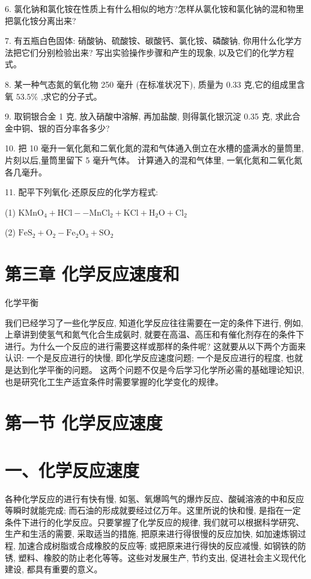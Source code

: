 \documentclass[10pt]{article}
\begin{document}
6. 氯化钠和氯化铵在性质上有什么相似的地方?怎样从氯化铵和氯化钠的混和物里把氯化铵分离出来?

7. 有五瓶白色固体: 硝酸钠、硫酸铵、碳酸钙、氯化铵、磷酸钠, 你用什么化学方法把它们分别检验出来? 写出实验操作步骤和产生的现象, 以及它们的化学方程式。

8. 某一种气态氮的氧化物 250 毫升 (在标准状况下), 质量为 0.33 克,它的组成里含氧 \({53.5}\%\) ,求它的分子式。

9. 取铜银合金 1 克, 放入硝酸中溶解, 再加盐酸, 则得氯化银沉淀 0.35 克, 求此合金中铜、银的百分率各多少?

10. 把 10 毫升一氧化氮和二氧化氮的混和气体通入倒立在水槽的盛满水的量筒里,片刻以后,量筒里留下 5 毫升气体。 计算通入的混和气体里, 一氧化氮和二氧化氮各几毫升。

11. 配平下列氧化-还原反应的化学方程式:

(1) \({\mathrm{{KMnO}}}_{4} + \mathrm{{HCl}} - - {\mathrm{{MnCl}}}_{2} + \mathrm{{KCl}} + {\mathrm{H}}_{2}\mathrm{O} + {\mathrm{{Cl}}}_{2}\)

(2) \({\mathrm{{FeS}}}_{2} + {\mathrm{O}}_{2} - {\mathrm{{Fe}}}_{2}{\mathrm{O}}_{3} + {\mathrm{{SO}}}_{2}\)

\section*{第三章 化学反应速度和}

化学平衡

我们已经学习了一些化学反应, 知道化学反应往往需要在一定的条件下进行, 例如, 上章讲到使氢气和氮气化合生成氨时, 就要在高温、高压和有催化剂存在的条件下进行。为什么一个反应的进行需要这样或那样的条件呢? 这就要从以下两个方面来认识: 一个是反应进行的快慢, 即化学反应速度问题; 一个是反应进行的程度, 也就是达到化学平衡的问题。 这两个问题不仅是今后学习化学所必需的基础理论知识, 也是研究化工生产适宜条件时需要掌握的化学变化的规律。

\section*{第一节 化学反应速度}

\section*{一、化学反应速度}

各种化学反应的进行有快有慢, 如氢、氧爆鸣气的爆炸反应、酸碱溶液的中和反应等瞬时就能完成; 而石油的形成就要经过亿万年。这里所说的快和慢, 是指在一定条件下进行的化学反应。只要掌握了化学反应的规律, 我们就可以根据科学研究、生产和生活的需要, 采取适当的措施, 把原来进行得很慢的反应加快, 如加速炼钢过程, 加速合成树脂或合成橡胶的反应等; 或把原来进行得快的反应减慢, 如钢铁的防锈, 塑料、橡胶的防止老化等等。这些对发展生产, 节约支出, 促进社会主义现代化建设, 都具有重要的意义。
\end{document}

